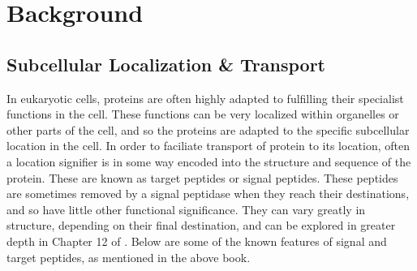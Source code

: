 \documentclass{bioinfo}
\begin{document}




\section{Background}

\subsection{Subcellular Localization \& Transport}

In eukaryotic cells, proteins are often highly adapted to fulfilling their specialist functions in the cell.
These functions can be very localized within organelles or other parts of the cell, and so the proteins are adapted to the specific subcellular location in the cell. 
In order to faciliate transport of protein to its location, often a location signifier is in some way encoded into the structure and sequence of the protein.
These are known as target peptides or signal peptides. 
These peptides are sometimes removed by a signal peptidase when they reach their destinations, and so have little other functional significance. 
They can vary greatly in structure, depending on their final destination, and can be explored in greater depth in Chapter 12 of \cite{Alb00}. 
Below are some of the known features of signal and target peptides, as mentioned in the above book.
\end{document}
